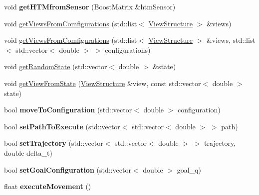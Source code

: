 \begin{DoxyCompactItemize}
\item 
void {\bfseries get\+H\+T\+Mfrom\+Sensor} (Boost\+Matrix \&htm\+Sensor)\hypertarget{classRobotSensor_a6b05b86155accadb8dd797eaa6d9ed0c}{}\label{classRobotSensor_a6b05b86155accadb8dd797eaa6d9ed0c}

\item 
void \hyperlink{classRobotSensor_a8d03fa5829bcbfcd9e65461da3a3e88d}{get\+Views\+From\+Comfigurations} (std\+::list$<$ \hyperlink{classViewStructure}{View\+Structure} $>$ \&views)
\item 
void \hyperlink{classRobotSensor_aaadde4cfbe409e2e307916ffe750a64a}{get\+Views\+From\+Comfigurations} (std\+::list$<$ \hyperlink{classViewStructure}{View\+Structure} $>$ \&views, std\+::list$<$ std\+::vector$<$ double $>$ $>$ configurations)
\item 
void \hyperlink{classRobotSensor_a2ba12e8c33f6811634305ee892c2a237}{get\+Random\+State} (std\+::vector$<$ double $>$ \&state)
\item 
void \hyperlink{classRobotSensor_ae7b1b9acbc27b88a365e8a927355e08e}{get\+View\+From\+State} (\hyperlink{classViewStructure}{View\+Structure} \&view, const std\+::vector$<$ double $>$ state)
\item 
bool {\bfseries move\+To\+Configuration} (std\+::vector$<$ double $>$ configuration)\hypertarget{classRobotSensor_ab6fd30a1c23f1ed147eb9597297ae515}{}\label{classRobotSensor_ab6fd30a1c23f1ed147eb9597297ae515}

\item 
bool {\bfseries set\+Path\+To\+Execute} (std\+::vector$<$ std\+::vector$<$ double $>$ $>$ path)\hypertarget{classRobotSensor_a4c5f272ecc68c91880826298857a5457}{}\label{classRobotSensor_a4c5f272ecc68c91880826298857a5457}

\item 
bool {\bfseries set\+Trajectory} (std\+::vector$<$ std\+::vector$<$ double $>$ $>$ trajectory, double delta\+\_\+t)\hypertarget{classRobotSensor_a3c0cef902dea177c28e32a9f505f493f}{}\label{classRobotSensor_a3c0cef902dea177c28e32a9f505f493f}

\item 
bool {\bfseries set\+Goal\+Configuration} (std\+::vector$<$ double $>$ goal\+\_\+q)\hypertarget{classRobotSensor_a639eb18da8934854b3bbb2c468c029ba}{}\label{classRobotSensor_a639eb18da8934854b3bbb2c468c029ba}

\item 
float {\bfseries execute\+Movement} ()\hypertarget{classRobotSensor_af91b4528c7f490ba9236056f4fb9cfd3}{}\label{classRobotSensor_af91b4528c7f490ba9236056f4fb9cfd3}


\end{DoxyCompactItemize}
